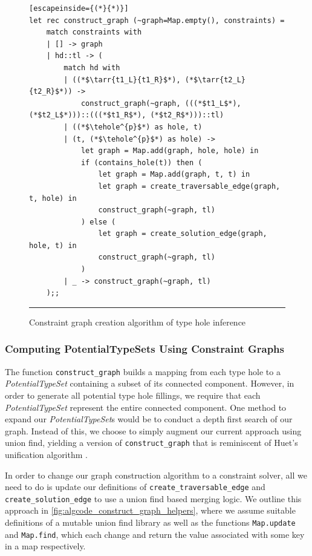 \begin{figure}[hbt!]
\begin{lstlisting}[escapeinside={(*}{*)}]
let rec construct_graph (~graph=Map.empty(), constraints) =
    match constraints with
    | [] -> graph
    | hd::tl -> (
        match hd with
        | ((*$\tarr{t1_L}{t1_R}$*), (*$\tarr{t2_L}{t2_R}$*)) ->
            construct_graph(~graph, (((*$t1_L$*), (*$t2_L$*)))::(((*$t1_R$*), (*$t2_R$*)))::tl)
        | ((*$\tehole^{p}$*) as hole, t)
        | (t, (*$\tehole^{p}$*) as hole) ->
            let graph = Map.add(graph, hole, hole) in
            if (contains_hole(t)) then (
                let graph = Map.add(graph, t, t) in
                let graph = create_traversable_edge(graph, t, hole) in
                construct_graph(~graph, tl)
            ) else (
                let graph = create_solution_edge(graph, hole, t) in
                construct_graph(~graph, tl)
            )
        | _ -> construct_graph(~graph, tl)
    );;

\end{lstlisting}
\vspace{-4px}
\hrule
\caption{Constraint graph creation algorithm of type hole inference}
\label{fig:algcode_construct_graph}
\end{figure}

\subsubsection{Computing PotentialTypeSets Using Constraint Graphs} 
The function \lstinline{construct_graph} builds a mapping from each type hole to a \emph{PotentialTypeSet} containing a subset of its connected component. However, in order to generate all potential type hole fillings, we require that each \emph{PotentialTypeSet} represent the entire connected component. One method to expand our \emph{PotentialTypeSet}s would be to conduct a depth first search of our graph. Instead of this, we choose to simply augment our current approach using union find, yielding a version of \lstinline{construct_graph} that is reminiscent of Huet's unification algorithm \cite{Huet}.

In order to change our graph construction algorithm to a constraint solver, all we need to do is update our definitions of \lstinline{create_traversable_edge} and \lstinline{create_solution_edge} to use a union find based merging logic. We outline this approach in \ref{fig:algcode_construct_graph_helpers}, where we assume suitable definitions of a mutable union find library as well as the functions \lstinline{Map.update} and \lstinline{Map.find}, which each change and return the value associated with some key in a map respectively.

